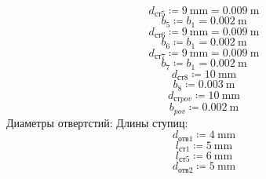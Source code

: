 \documentclass{article}
\newcommand{\defeq}{\coloneq} %
\begin{document}
\begin{equation*}
\textit{d}_{\textit{ст5}} \defeq 9 \: \mathrm{mm} = {0.009 \: \mathrm{m}}
\end{equation*}
\begin{equation*}
\textit{b}_{\textit{5}} \defeq \textit{b}_{\textit{1}} = {0.002 \: \mathrm{m}}
\end{equation*}
\begin{equation*}
\textit{d}_{\textit{ст6}} \defeq 9 \: \mathrm{mm} = {0.009 \: \mathrm{m}}
\end{equation*}
\begin{equation*}
\textit{b}_{\textit{6}} \defeq \textit{b}_{\textit{1}} = {0.002 \: \mathrm{m}}
\end{equation*}
\begin{equation*}
\textit{d}_{\textit{ст7}} \defeq 9 \: \mathrm{mm} = {0.009 \: \mathrm{m}}
\end{equation*}
\begin{equation*}
\textit{b}_{\textit{7}} \defeq \textit{b}_{\textit{1}} = {0.002 \: \mathrm{m}}
\end{equation*}
\begin{equation*}
\textit{d}_{\textit{ст8}} \defeq 10 \: \mathrm{mm}
\end{equation*}
\begin{equation*}
\textit{b}_{\textit{8}} \defeq 0.003 \: \mathrm{m}
\end{equation*}
\begin{equation*}
d_{стpov} \defeq 10 \: \mathrm{mm}
\end{equation*}
\begin{equation*}
b_{pov} \defeq 0.002 \: \mathrm{m}
\end{equation*}
\colorbox[HTML]{000000}{Диаметры отвертстий:}\newline
\colorbox[HTML]{000000}{Длины ступиц:}\newline
\begin{equation*}
\textit{d}_{\textit{отв1}} \defeq 4 \: \mathrm{mm}
\end{equation*}
\begin{equation*}
\textit{l}_{\textit{ст1}} \defeq 5 \: \mathrm{mm}
\end{equation*}
\begin{equation*}
\textit{l}_{\textit{ст5}} \defeq 6 \: \mathrm{mm}
\end{equation*}
\begin{equation*}
\textit{d}_{\textit{отв2}} \defeq 5 \: \mathrm{mm}
\end{equation*}
\end{document}
